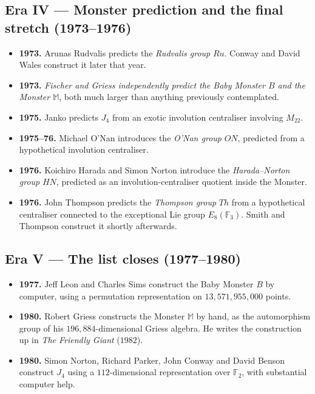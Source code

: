 \documentclass[11pt]{article}
\newcommand{\M}{\mathbb{M}}
\begin{document}
\subsection*{Era IV --- Monster prediction and the final stretch (1973--1976)}

\begin{itemize}[leftmargin=*, itemsep=2pt]
  \item \textbf{1973.} Arunas Rudvalis predicts the
        \emph{Rudvalis group} $\mathit{Ru}$. Conway and David Wales
        construct it later that year.
  \item \textbf{1973.} \emph{Fischer and Griess independently
        predict the Baby Monster $B$ and the Monster $\M$}, both
        much larger than anything previously contemplated.
  \item \textbf{1975.} Janko predicts $J_4$ from an exotic
        involution centraliser involving $M_{22}$.
  \item \textbf{1975--76.} Michael O'Nan introduces the
        \emph{O'Nan group} $\mathit{ON}$, predicted from a
        hypothetical involution centraliser.
  \item \textbf{1976.} Koichiro Harada and Simon Norton introduce the
        \emph{Harada--Norton group} $\mathit{HN}$, predicted as an
        involution-centraliser quotient inside the Monster.
  \item \textbf{1976.} John Thompson predicts the \emph{Thompson
        group} $\mathit{Th}$ from a hypothetical centraliser
        connected to the exceptional Lie group $E_8(\mathbb{F}_3)$.
        Smith and Thompson construct it shortly afterwards.
\end{itemize}

\subsection*{Era V --- The list closes (1977--1980)}

\begin{itemize}[leftmargin=*, itemsep=2pt]
  \item \textbf{1977.} Jeff Leon and Charles Sims construct the
        Baby Monster $B$ by computer, using a permutation
        representation on $13{,}571{,}955{,}000$ points.
  \item \textbf{1980.} Robert Griess constructs the Monster $\M$ by
        hand, as the automorphism group of his $196{,}884$-dimensional
        Griess algebra. He writes the construction up in
        \emph{The Friendly Giant} ($1982$).
  \item \textbf{1980.} Simon Norton, Richard Parker, John Conway and
        David Benson construct $J_4$ using a $112$-dimensional
        representation over $\mathbb{F}_2$, with substantial
        computer help.
\end{itemize}
\end{document}
